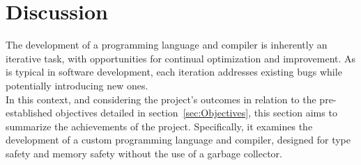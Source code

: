 \section{Discussion}
\label{sec:Discussion}

The development of a programming language and compiler is inherently an iterative
task, with opportunities for continual optimization and improvement. As is typical in
software development, each iteration addresses existing bugs while potentially
introducing new ones. \\

In this context, and considering the project's outcomes in relation to the
pre-established objectives detailed in section~\ref{sec:Objectives}, this section
aims to summarize the achievements of the project. Specifically, it examines the
development of a custom programming language and compiler, designed for type safety
and memory safety without the use of a garbage collector. \\


\newpage
